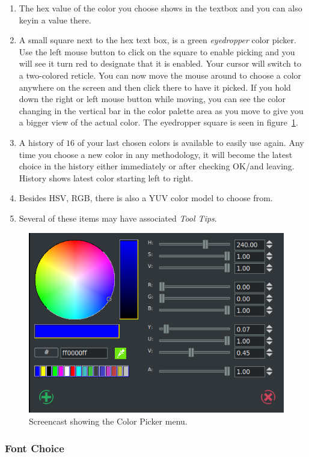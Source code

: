 {\begin{enumerate}
    \item The hex value of the color you choose shows in the textbox and you can also keyin a value there.
    \item A small square next to the hex text box, is a green \textit{eyedropper} color picker. Use the left mouse button to click on the square to enable picking and you will see it turn red to designate that it is enabled. Your cursor will switch to a two-colored reticle. You can now move the mouse around to choose a color anywhere on the screen and then click there to have it picked. If you hold down the right or left mouse button while moving, you can see the color changing in the vertical bar in the color palette area as you move to give you a bigger view of the actual color. The eyedropper square is seen in figure~\ref{fig:title04}.
    \item A history of $16$ of your last chosen colors is available to easily use again. Any time you choose a new color in any methodology, it will become the latest choice in the history either immediately or after checking OK/and leaving. History shows latest color starting left to right.
    \item Besides HSV, RGB, there is also a YUV color model to choose from.
    \item Several of these items may have associated \textit{Tool Tips}.
\end{enumerate}

\begin{figure}[hbtp]
    \centering
    \includegraphics[width=0.5\linewidth]{images/title04.png}
    \caption{Screencast showing the Color Picker menu.}
    \label{fig:title04}
\end{figure}

\subsubsection*{Font Choice}%
\label{ssub:font_choice}

}
